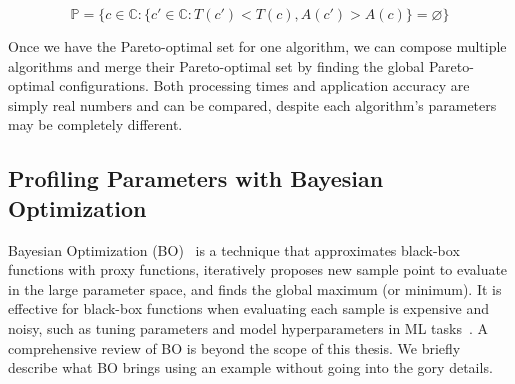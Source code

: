 {\small \vspace{-1em}
  \begin{equation}
    \mathbb{P} = \{ c \in \mathbb{C} : \{ c' \in \mathbb{C}: T(c') < T(c),
    A(c') > A(c) \} = \varnothing\}
  \label{eq:pareto2}
\end{equation}
}%

Once we have the Pareto-optimal set for one algorithm, we can compose multiple
algorithms and merge their Pareto-optimal set by finding the global
Pareto-optimal configurations. Both processing times and application accuracy
are simply real numbers and can be compared, despite each algorithm's parameters
may be completely different.

\subsection{Profiling Parameters with Bayesian Optimization}
\label{sec:prof-param-with}

Bayesian Optimization (BO)~\cite{snoek2012practical} is a technique that
approximates black-box functions with proxy functions, iteratively proposes new
sample point to evaluate in the large parameter space, and finds the global
maximum (or minimum). It is effective for black-box functions when evaluating
each sample is expensive and noisy, such as tuning parameters and model
hyperparameters in ML tasks~\cite{snoek2012practical}. A comprehensive review of
BO is beyond the scope of this thesis. We briefly describe what BO brings using
an example without going into the gory details.

